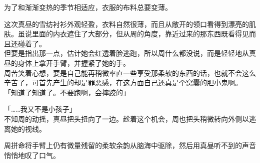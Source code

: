 为了和渐渐变热的季节相适应，衣服的布料总要变薄。

这次真昼的雪纺衬衫外观轻盈，衣料自然很薄，而且从敞开的领口看得到漂亮的肌肤。虽说里面的内衣遮住了大部分，但从周的角度，靠近过来的那东西既看得见而且还碰着了。\\

但要是指出那一点，估计她会红透着脸逃跑，所以周什么都没说，而是轻轻地从真昼的身体上拿开手臂，并握紧了她的手。\\

周苦笑着心想，要是自己能再稍微率直一些享受那柔软的东西的话，也就不会这么辛苦了，可首先产生的却是罪恶感，在这方面自己还真是个窝囊的胆小鬼啊。\\

「知道了知道了。不要跑啊，会摔跤的」

「……我又不是小孩子」\\

不知周的动摇，真昼把头扭向了一边。趁着这个机会，周也把头稍微转向外侧以逃离她的视线。

周拼命将手臂上仍有微量残留的柔软余韵从脑海中驱除，然后用真昼听不到的声音悄悄地叹了口气。
